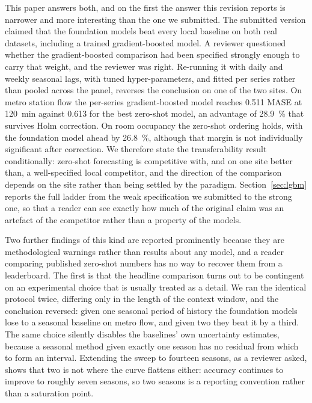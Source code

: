 \documentclass[11pt]{article}
\theoremstyle{plain}
\theoremstyle{definition}
\theoremstyle{remark}
\newif\ifrevisionmarkup
\newcommand{\new}[1]{\ifrevisionmarkup\textcolor{revision}{#1}\else#1\fi}
\begin{document}
This paper answers both, \new{and on the first the answer this revision reports is narrower and more interesting than the one we submitted. The submitted version claimed that the foundation models beat every local baseline on both real datasets, including a trained gradient-boosted model. A reviewer questioned whether the gradient-boosted comparison had been specified strongly enough to carry that weight, and the reviewer was right. Re-running it with daily and weekly seasonal lags, with tuned hyper-parameters, and fitted per series rather than pooled across the panel, reverses the conclusion on one of the two sites. On metro station flow the per-series gradient-boosted model reaches \num{0.511} MASE at \SI{120}{\minute} against \num{0.613} for the best zero-shot model, an advantage of \SI{28.9}{\percent} that survives Holm correction. On room occupancy the zero-shot ordering holds, with the foundation model ahead by \SI{26.8}{\percent}, although that margin is not individually significant after correction. We therefore state the transferability result conditionally: zero-shot forecasting is competitive with, and on one site better than, a well-specified local competitor, and the direction of the comparison depends on the site rather than being settled by the paradigm. Section~\ref{sec:lgbm} reports the full ladder from the weak specification we submitted to the strong one, so that a reader can see exactly how much of the original claim was an artefact of the competitor rather than a property of the models.}

\new{Two further findings of this kind are reported prominently because they are methodological warnings rather than results about any model, and a reader comparing published zero-shot numbers has no way to recover them from a leaderboard.} \new{The first is that the headline comparison} turns out to be contingent on an experimental choice that is usually treated as a detail. We ran the identical protocol twice, differing only in the length of the context window, and the conclusion reversed: given one seasonal period of history the foundation models lose to a seasonal baseline on metro flow, and given two they beat it by a third. The same choice silently disables the baselines' own uncertainty estimates, because a seasonal method given exactly one season has no residual from which to form an interval. \new{Extending the sweep to fourteen seasons, as a reviewer asked, shows that two is not where the curve flattens either: accuracy continues to improve to roughly seven seasons, so two seasons is a reporting convention rather than a saturation point.}
\end{document}
